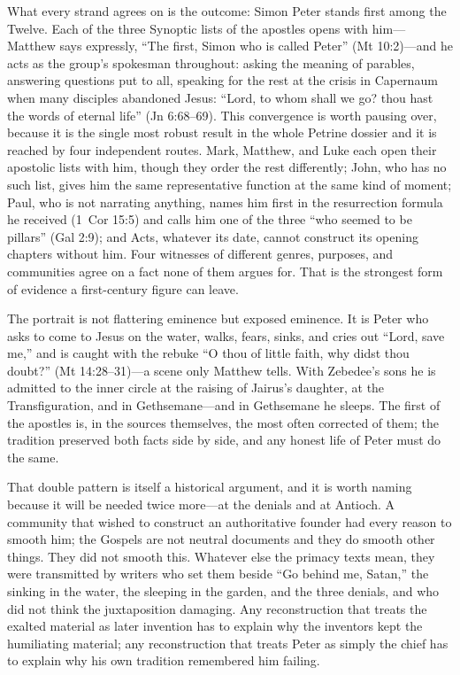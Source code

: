 What every strand agrees on is the outcome: Simon Peter stands first among
the Twelve. Each of the three Synoptic lists of the apostles opens with
him---Matthew says expressly, ``The first, Simon who is called Peter''
(Mt 10:2)---and he acts as the group's spokesman throughout: asking the
meaning of parables, answering questions put to all, speaking for the rest
at the crisis in Capernaum when many disciples abandoned Jesus: ``Lord, to
whom shall we go? thou hast the words of eternal life'' (Jn 6:68--69). This
convergence is worth pausing over, because it is the single most robust
result in the whole Petrine dossier and it is reached by four independent
routes. Mark, Matthew, and Luke each open their apostolic lists with him,
though they order the rest differently; John, who has no such list, gives him
the same representative function at the same kind of moment; Paul, who is not
narrating anything, names him first in the resurrection formula he received
(1~Cor 15:5) and calls him one of the three ``who seemed to be pillars''
(Gal 2:9); and Acts, whatever its date, cannot construct its opening chapters
without him. Four witnesses of different genres, purposes, and communities
agree on a fact none of them argues for. That is the strongest form of
evidence a first-century figure can leave.

The portrait is not flattering eminence but exposed eminence. It is Peter who
asks to come to Jesus on the water, walks, fears, sinks, and cries out
``Lord, save me,'' and is caught with the rebuke ``O thou of little faith,
why didst thou doubt?'' (Mt 14:28--31)---a scene only Matthew tells. With
Zebedee's sons he is admitted to the inner circle at the raising of Jairus's
daughter, at the Transfiguration, and in Gethsemane---and in Gethsemane he
sleeps. The first of the apostles is, in the sources themselves, the most
often corrected of them; the tradition preserved both facts side by side,
and any honest life of Peter must do the same.

That double pattern is itself a historical argument, and it is worth naming
because it will be needed twice more---at the denials and at Antioch. A
community that wished to construct an authoritative founder had every reason
to smooth him; the Gospels are not neutral documents and they do smooth other
things. They did not smooth this. Whatever else the primacy texts mean, they
were transmitted by writers who set them beside ``Go behind me, Satan,'' the
sinking in the water, the sleeping in the garden, and the three denials, and
who did not think the juxtaposition damaging. Any reconstruction that treats
the exalted material as later invention has to explain why the inventors kept
the humiliating material; any reconstruction that treats Peter as simply the
chief has to explain why his own tradition remembered him failing.
